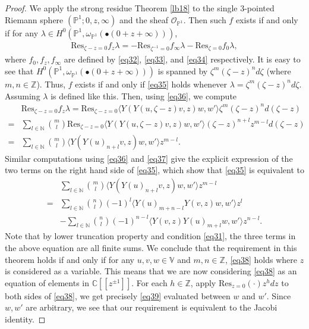 \documentclass[12pt,a4paper,notitlepage]{report}
\theoremstyle{definition}
\theoremstyle{plain}
\newcommand{\Res}{\mathrm{Res}}
\newcommand{\bk}[1]{\langle {#1}\rangle}
\newcommand{\scr}{\mathscr}
\newcommand{\mbb}{\mathbb}
\newcommand{\blt}{\bullet}
\newcommand{\Nbb}{\mathbb N}
\numberwithin{equation}{section}
\begin{document}
\begin{proof}
We apply the strong residue Theorem \ref{lb18} to the  single $3$-pointed Riemann sphere $(\mbb P^1;0,z,\infty)$ and the sheaf $\scr O_{\mbb P^1}$. Then such $f$ exists if and only if for any $\lambda\in H^0(\mbb P^1,\omega_{\mbb P^1}(\blt(0+z+\infty)))$,
\begin{align}
\Res_{\zeta-z=0}f_z\lambda=-\Res_{\zeta^{-1}=0} f_\infty\lambda-\Res_{\zeta=0}f_0\lambda,\label{eq35}
\end{align}
where $f_0,f_z,f_\infty$ are defined by  \eqref{eq32}, \eqref{eq33}, and \eqref{eq34} respectively. It is easy to see that $H^0(\mbb P^1,\omega_{\mbb P^1}(\blt(0+z+\infty)))$ is spanned by $\zeta^m(\zeta-z)^nd\zeta$ (where $m,n\in\mbb Z$). Thus, $f$ exists if and only if \eqref{eq35} holds whenever $\lambda=\zeta^m(\zeta-z)^nd\zeta$. Assuming $\lambda$ is defined like this. Then, using \eqref{eq36}, we compute
\begin{align*}
&\Res_{\zeta-z=0}f_z\lambda=\Res_{\zeta-z=0}\bk{Y(Y(u,\zeta-z)v,z)w,w'}\zeta^m(\zeta-z)^nd(\zeta-z)\\
=&\sum_{l\in\Nbb}{m\choose l}\Res_{\zeta-z=0}\bk{Y(Y(u,\zeta-z)v,z)w,w'}(\zeta-z)^{n+l}z^{m-l}d(\zeta-z)\\
=&\sum_{l\in\Nbb}{m\choose l}\bk{Y(Y(u)_{n+l}v,z)w,w'}z^{m-l}.
\end{align*}
Similar computations using \eqref{eq36} and \eqref{eq37} give the explicit expression of the two terms on the right hand side of \eqref{eq35}, which show that \eqref{eq35} is equivalent to
\begin{align}
&\sum_{l\in\Nbb}{m\choose l}\bk{Y(Y(u)_{n+l}v,z)w,w'}z^{m-l}\nonumber\\
=&\sum_{l\in\Nbb}{n\choose l}(-1)^l\bk{Y(u)_{m+n-l}Y(v,z)w,w'}z^l\nonumber\\
&-\sum_{l\in\Nbb}{n\choose l}(-1)^{n-l}\bk{Y(v,z)Y(u)_{m+l}w,w'}z^{n-l}.\label{eq38}
\end{align}
Note that by lower truncation property and condition \eqref{eq31}, the three terms in the above equation are all finite sums. We conclude that the requirement in this theorem holds if and only if for any $u,v,w\in\mbb V$ and $m,n\in\mbb Z$, \eqref{eq38} holds where $z$ is considered as a variable. This means that  we are now considering \eqref{eq38} as an equation of elements in $\mbb C[[z^{\pm 1}]]$. For each $h\in\mbb Z$, apply $\Res_{z=0}(\cdot)z^hdz$ to both sides of \eqref{eq38}, we get precisely \eqref{eq39} evaluated between $w$ and $w'$. Since $w,w'$ are arbitrary, we see that our requirement is equivalent to the Jacobi identity.
\end{proof}
\end{document}

